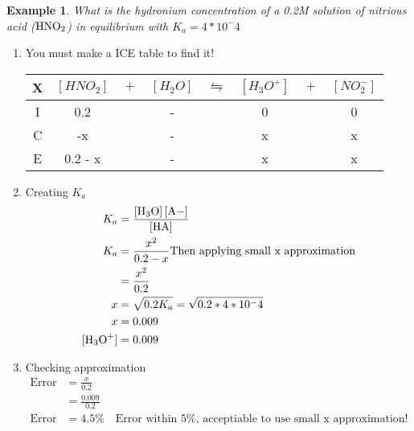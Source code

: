\documentclass{article}  %
\newtheorem{exmp}{Example}
\begin{document}
\begin{exmp}
    What is the hydronium concentration of a 0.2M solution of nitrious acid ($\ce{HNO2}$) in equilibrium with $K_a = 4*10^-4$
\end{exmp}
\begin{enumerate}
    \item You must make a ICE table to find it! \\
    \begin{tabular}{c|c@{}c@{}c@{}c@{}c@{}c@{}c}
        \hline
        X   &   $[HNO_2]$ & ${}+{}$ & $[H_2O]$ & ${}\leftrightharpoons{}$ & $[H_3O^+]$ & ${}+{}$ & $[NO_2^-]$\\
        \hline
        I   & 0.2 && - &&  0 && 0       \\
        C   & -x && - &&  x && x      \\
        E   & 0.2 - x && - && x && x      \\
        \hline
      \end{tabular}
    \item Creating $K_a$ 
    \begin{equation*}
        \begin{aligned}
            K_a &= \ce{\frac{[H3O] [A-]}{[HA]}} \\
            K_a &= \frac{x^2}{0.2-x} \text{Then applying small x approximation} \\
                &= \frac{x^2}{0.2} \\
            x   &= \sqrt{0.2K_a} = \sqrt{0.2*4*10^-4} \\
            x   &= 0.009 \\
            \ce{[H3O+]} &= 0.009
        \end{aligned}
    \end{equation*}
    \item Checking approximation 
    \begin{equation*}
        \begin{aligned}
            \text{Error} &= \frac{x}{0.2} \\
            &= \frac{0.009}{0.2} \\
            \text{Error} &= 4.5\% \quad \text{Error within 5\%, acceptiable to use small x approximation!}
        \end{aligned}
    \end{equation*}
\end{enumerate}
\end{document}
